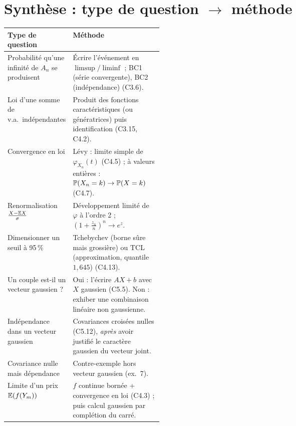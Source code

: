 \documentclass[11pt,a4paper]{article}
\begin{document}
\section*{Synthèse : type de question $\to$ méthode}
\renewcommand{\arraystretch}{1.3}
\begin{tabularx}{\linewidth}{@{}>{\raggedright\arraybackslash}p{0.36\linewidth}X@{}}
\toprule
Type de question & Méthode\\\midrule
Probabilité qu'une infinité de $A_n$ se produisent & Écrire l'événement en $\limsup/\liminf$ ; BC1 (série convergente), BC2 (indépendance) (C3.6).\\
Loi d'une somme de v.a.\ indépendantes & Produit des fonctions caractéristiques (ou génératrices) puis identification (C3.15, C4.2).\\
Convergence en loi & Lévy : limite simple de $\varphi_{X_n}(t)$ (C4.5) ; à valeurs entières : $\mathbb{P}(X_n=k)\to\mathbb{P}(X=k)$ (C4.7).\\
Renormalisation $\frac{X-\mathbb{E} X}{\sigma}$ & Développement limité de $\varphi$ à l'ordre 2 ; $(1+\frac{z_n}n)^n\to e^z$.\\
Dimensionner un seuil à 95\,\% & Tchebychev (borne sûre mais grossière) ou TCL (approximation, quantile $1{,}645$) (C4.13).\\
Un couple est-il un vecteur gaussien ? & Oui : l'écrire $AX+b$ avec $X$ gaussien (C5.5). Non : exhiber une combinaison linéaire non gaussienne.\\
Indépendance dans un vecteur gaussien & Covariances croisées nulles (C5.12), \emph{après} avoir justifié le caractère gaussien du vecteur joint.\\
Covariance nulle mais dépendance & Contre-exemple hors vecteur gaussien (ex.~7).\\
Limite d'un prix $\mathbb{E}(f(Y_m))$ & $f$ continue bornée + convergence en loi (C4.3) ; puis calcul gaussien par complétion du carré.\\\bottomrule
\end{tabularx}
\end{document}
